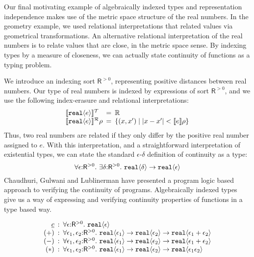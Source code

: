 Our final motivating example of algebraically indexed types and
representation independence makes use of the metric space structure of
the real numbers. In the geometry example, we used relational
interpretations that related values via geometrical
transformations. An alternative relational interpretation of the real
numbers is to relate values that are close, in the metric space
sense. By indexing types by a measure of closeness, we can actually
state continuity of functions as a typing problem.

We introduce an indexing sort $\mathsf{R}^{>0}$, representing positive
distances between real numbers. Our type of real numbers is indexed by
expressions of sort $\mathsf{R}^{>0}$, and we use the following
index-erasure and relational interpretations:
\begin{displaymath}
  \begin{array}{l@{\hspace{0.5em}=\hspace{0.5em}}l}
    \tySem{\tyPrim{real}{e}} & \mathbb{R} \\
    \rsem{\tyPrim{real}{e}}{}\rho & \{ (x,x') \sepbar |x-x'| < \sem{e}\rho \}
  \end{array}
\end{displaymath}
Thus, two real numbers are related if they only differ by the positive
real number assigned to $e$. With this interpretation, and a
straightforward interpretation of existential types, we can state the
standard $\epsilon$-$\delta$ definition of continuity as a type:
\begin{displaymath}
  \forall \epsilon \mathord: \mathsf{R}^{>0}.\ \exists \delta\mathord: \mathsf{R}^{>0}.\ \textup{\texttt{real}}\langle \delta \rangle \to \textup{\texttt{real}}\langle \epsilon \rangle
\end{displaymath}
Chaudhuri, Gulwani and Lublinerman \cite{chaudhuri10continuity} have
presented a program logic based approach to verifying the continuity
of programs. Algebraically indexed types give us a way of expressing
and verifying continuity properties of functions in a type based way.

\begin{displaymath}
  \begin{array}{r@{\hspace{0.5em}:\hspace{0.5em}}l}
    \underline{c} & \forall \epsilon\mathord:\mathsf{R}^{>0}.\ \tyPrim{real}{\epsilon} \\
    (+) & \forall \epsilon_1, \epsilon_2\mathord:\mathsf{R}^{>0}.\ \tyPrim{real}{\epsilon_1} \to \tyPrim{real}{\epsilon_2} \to \tyPrim{real}{\epsilon_1 + \epsilon_2} \\
    (-) & \forall \epsilon_1, \epsilon_2\mathord:\mathsf{R}^{>0}.\ \tyPrim{real}{\epsilon_1} \to \tyPrim{real}{\epsilon_2} \to \tyPrim{real}{\epsilon_1 + \epsilon_2} \\
    (*) & \forall \epsilon_1, \epsilon_2\mathord:\mathsf{R}^{>0}.\ \tyPrim{real}{\epsilon_1} \to \tyPrim{real}{\epsilon_2} \to \tyPrim{real}{\epsilon_1\epsilon_2}
  \end{array}
\end{displaymath}

